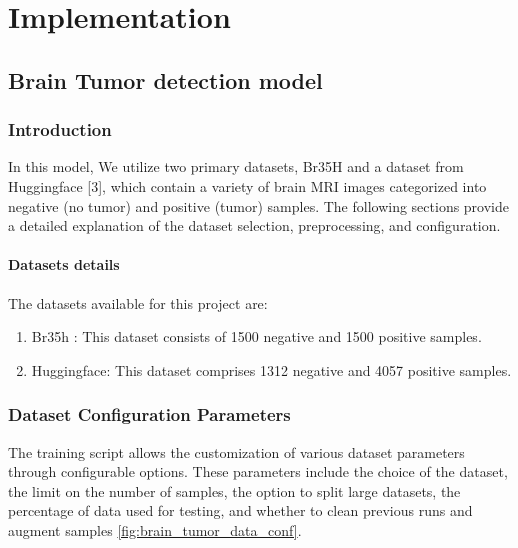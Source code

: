 \chapter{Implementation}

\section{Brain Tumor detection model}
 
\subsection{Introduction}
 
 In this model, We utilize two primary datasets, Br35H \cite{br35h} and a dataset from Huggingface [3], which contain a variety of brain MRI images categorized into negative (no tumor) and positive (tumor) samples. The following sections provide a detailed explanation of the dataset selection, preprocessing, and configuration.
 
\subsubsection{Datasets details}

The datasets available for this project are: 

\begin{enumerate}
    \item Br35h \cite{br35h}: This dataset consists of 1500 negative and 1500 positive samples.
    \item Huggingface: This dataset comprises 1312 negative and 4057 positive samples.
\end{enumerate}


\subsection{Dataset Configuration Parameters}

The training script allows the customization of various dataset parameters through configurable options. These parameters include the choice of the dataset, the limit on the number of samples, the option to split large datasets, the percentage of data used for testing, and whether to clean previous runs and augment samples \ref{fig:brain_tumor_data_conf}.

